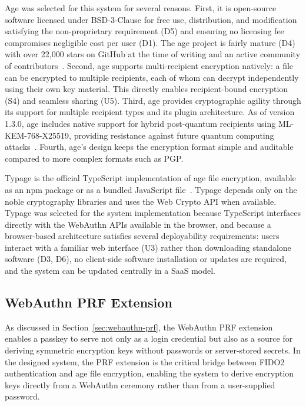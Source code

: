 Age was selected for this system for several reasons. First, it is open-source software licensed under BSD-3-Clause for free use, distribution, and modification~\cite{age_repo} satisfying the non-proprietary requirement (D5) and ensuring no licensing fee compromises negligible cost per user (D1). The age project is fairly mature (D4) with over 22{,}000 stars on GitHub at the time of writing and an active community of contributors~\cite{age_repo}. Second, age supports multi-recipient encryption natively: a file can be encrypted to multiple recipients, each of whom can decrypt independently using their own key material. This directly enables recipient-bound encryption (S4) and seamless sharing (U5). Third, age provides cryptographic agility through its support for multiple recipient types and its plugin architecture. As of version 1.3.0, age includes native support for hybrid post-quantum recipients using ML-KEM-768-X25519, providing resistance against future quantum computing attacks~\cite{age_repo,age_spec}. Fourth, age's design keeps the encryption format simple and auditable compared to more complex formats such as PGP.

Typage is the official TypeScript implementation of age file encryption, available as an npm package or as a bundled JavaScript file~\cite{typage_repo}. Typage depends only on the noble cryptography libraries and uses the Web Crypto API when available. Typage was selected for the system implementation because TypeScript interfaces directly with the WebAuthn APIs available in the browser, and because a browser-based architecture satisfies several deployability requirements: users interact with a familiar web interface (U3) rather than downloading standalone software (D3, D6), no client-side software installation or updates are required, and the system can be updated centrally in a SaaS model.

\subsection{WebAuthn PRF Extension}
\label{sec:prf-tech-selection}

As discussed in Section~\ref{sec:webauthn-prf}, the WebAuthn PRF extension enables a passkey to serve not only as a login credential but also as a source for deriving symmetric encryption keys without passwords or server-stored secrets. In the designed system, the PRF extension is the critical bridge between FIDO2 authentication and age file encryption, enabling the system to derive encryption keys directly from a WebAuthn ceremony rather than from a user-supplied password.


